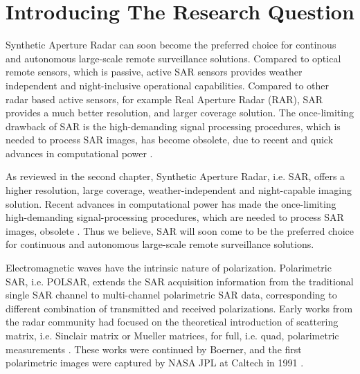 \chapter{Introducing The Research Question}

Synthetic Aperture Radar can soon become the preferred choice for
  continous and autonomous large-scale remote surveillance solutions.
Compared to optical remote sensors, which is passive,
  active SAR sensors provides weather independent and night-inclusive operational capabilities.
Compared to other radar based active sensors, for example Real Aperture Radar (RAR),
  SAR provides a much better resolution, and larger coverage solution.
The once-limiting drawback of SAR is the high-demanding signal processing procedures,
  which is needed to process SAR images, has become obsolete,
  due to recent and quick advances in computational power  \citep{Cumming_2005_Artech}.

As reviewed in the second chapter, Synthetic Aperture Radar, i.e. SAR, offers a higher resolution, large coverage, weather-independent and night-capable imaging solution.
Recent advances in computational power has made the once-limiting high-demanding signal-processing procedures, which are needed to process SAR images, obsolete \cite{Cumming_2005_Artech}.
Thus we believe, SAR will soon come to be the preferred choice for continuous and autonomous large-scale remote surveillance solutions.

Electromagnetic waves have the intrinsic nature of polarization.
Polarimetric SAR, i.e. POLSAR, extends the SAR acquisition information from the traditional single SAR channel to multi-channel polarimetric SAR data, corresponding to different combination of transmitted and received polarizations.
Early works from the radar community had focused on the theoretical introduction of scattering matrix, i.e. Sinclair matrix or Mueller matrices, for full, i.e. quad, polarimetric measurements \cite{Sinclair_1950_ProcsIRE}.
These works were continued by Boerner, and the first polarimetric images were captured by NASA JPL at Caltech in 1991 \cite{Zebker_1991_ProcsIEEE}.

